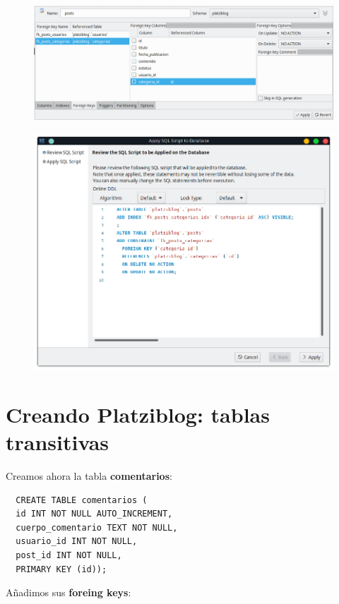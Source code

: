 \documentclass{article}
\begin{document}
\begin{figure}[h!]
  \centering
  \includegraphics[scale=0.55]{./Pictures/070_fk.png}
\end{figure}


\begin{figure}[h!]
  \centering
  \includegraphics[scale=0.55]{./Pictures/071_fk_confirm.png}
\end{figure}


\section{Creando Platziblog: tablas transitivas}%
Creamos ahora la tabla \textbf{comentarios}:

\begin{verbatim}
  CREATE TABLE comentarios (
  id INT NOT NULL AUTO_INCREMENT,
  cuerpo_comentario TEXT NOT NULL,
  usuario_id INT NOT NULL,
  post_id INT NOT NULL,
  PRIMARY KEY (id));
\end{verbatim}

Añadimos sus \textbf{foreing keys}:
\end{document}
